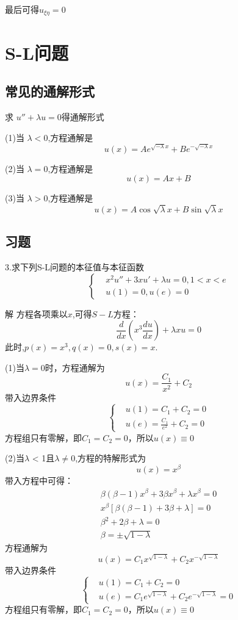 \documentclass{article}
\begin{document}
最后可得$u_{\xi\eta}=0$




\section{S-L问题}
\subsection{常见的通解形式}
求 $u''+\lambda u=0$得通解形式

(1)当 $\lambda <0$,方程通解是
$$
u(x)=Ae^{\sqrt{-\lambda }x}+Be^{-\sqrt{-\lambda }x}
$$

(2)当 $\lambda =0$,方程通解是
$$
u(x)=Ax + B
$$

(3)当 $\lambda >0$,方程通解是
$$
u(x)=A\cos \sqrt{\lambda }x+ B\sin \sqrt{\lambda }x
$$
\subsection{习题}
3.求下列S-L问题的本征值与本征函数
$$
    \left\{
    \begin{aligned}
         & x^2u''+3xu'+\lambda u=0,1<x<e \\
         & u(1)=0,u(e)=0
    \end{aligned}
    \right.
$$

解 \quad 方程各项乘以$x$,可得$S-L$方程：
$$
    \frac{d}{dx}(x^3 \frac{du}{dx}) + \lambda x u = 0
$$
此时,$p(x)=x^3,q(x)=0,s(x)=x.$

(1)当$\lambda=0$时，方程通解为
$$
    u(x) = \frac{C_1}{x^2} + C_2
$$
带入边界条件
$$
    \left\{
    \begin{aligned}
         & u(1)= C_1 + C_2 = 0           \\
         & u(e)= \frac{C_1}{e^2} + C_2=0
    \end{aligned}
    \right.
$$
方程组只有零解，即$C_1=C_2=0$，所以$u(x) \equiv 0$

(2)当$\lambda$ < 1且$\lambda \ne 0$,方程的特解形式为
$$
    u(x) = x^{\beta}
$$
带入方程中可得：
\begin{equation}
    \begin{aligned}
        \beta (\beta-1)x^{\beta} + 3 \beta x^{\beta} + \lambda x^{\beta} = 0 \\
        x^{\beta}[\beta (\beta-1) + 3 \beta + \lambda ] = 0                  \\
        \beta^2 + 2 \beta + \lambda = 0                                      \\
        \beta = \pm \sqrt{1-\lambda}
        \nonumber
    \end{aligned}
\end{equation}
方程通解为
$$  u(x)=C_1x^{\sqrt{1-\lambda}} + C_2x^{-\sqrt{1-\lambda}} $$
带入边界条件
$$
    \left\{
    \begin{aligned}
         & u(1)= C_1 + C_2 = 0                                        \\
         & u(e)= C_1e^{\sqrt{1-\lambda}} + C_2e^{-\sqrt{1-\lambda}}=0
    \end{aligned}
    \right.
$$
方程组只有零解，即$C_1=C_2=0$，所以$u(x) \equiv 0$
\end{document}
